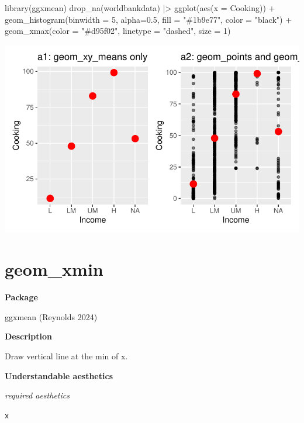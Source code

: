 \documentclass[
  letterpaper,
  DIV=11,
  numbers=noendperiod]{scrreprt}
\newenvironment{Shaded}{\begin{snugshade}}{\end{snugshade}}
\newcommand{\AttributeTok}[1]{\textcolor[rgb]{0.40,0.45,0.13}{#1}}
\newcommand{\DecValTok}[1]{\textcolor[rgb]{0.68,0.00,0.00}{#1}}
\newcommand{\FloatTok}[1]{\textcolor[rgb]{0.68,0.00,0.00}{#1}}
\newcommand{\FunctionTok}[1]{\textcolor[rgb]{0.28,0.35,0.67}{#1}}
\newcommand{\NormalTok}[1]{\textcolor[rgb]{0.00,0.23,0.31}{#1}}
\newcommand{\SpecialCharTok}[1]{\textcolor[rgb]{0.37,0.37,0.37}{#1}}
\newcommand{\StringTok}[1]{\textcolor[rgb]{0.13,0.47,0.30}{#1}}
\begin{document}
\begin{Shaded}
\begin{Highlighting}[]
\FunctionTok{library}\NormalTok{(ggxmean)}
\FunctionTok{drop\_na}\NormalTok{(worldbankdata) }\SpecialCharTok{|\textgreater{}}
\FunctionTok{ggplot}\NormalTok{(}\FunctionTok{aes}\NormalTok{(}\AttributeTok{x =}\NormalTok{ Cooking)) }\SpecialCharTok{+}
  \FunctionTok{geom\_histogram}\NormalTok{(}\AttributeTok{binwidth =} \DecValTok{5}\NormalTok{, }\AttributeTok{alpha=}\FloatTok{0.5}\NormalTok{, }\AttributeTok{fill =} \StringTok{"\#1b9e77"}\NormalTok{, }\AttributeTok{color =} \StringTok{"black"}\NormalTok{) }\SpecialCharTok{+} 
  \FunctionTok{geom\_xmax}\NormalTok{(}\AttributeTok{color =} \StringTok{"\#d95f02"}\NormalTok{, }\AttributeTok{linetype =} \StringTok{"dashed"}\NormalTok{, }\AttributeTok{size =} \DecValTok{1}\NormalTok{) }
\end{Highlighting}
\end{Shaded}

\includegraphics{x_files/figure-pdf/unnamed-chunk-3-1.pdf}

\section{geom\_xmin}\label{xmin}

\textbf{Package}

ggxmean (Reynolds 2024)

\textbf{Description}

Draw vertical line at the min of x.

\textbf{Understandable aesthetics}

\emph{required aesthetics}

\texttt{x}
\end{document}
